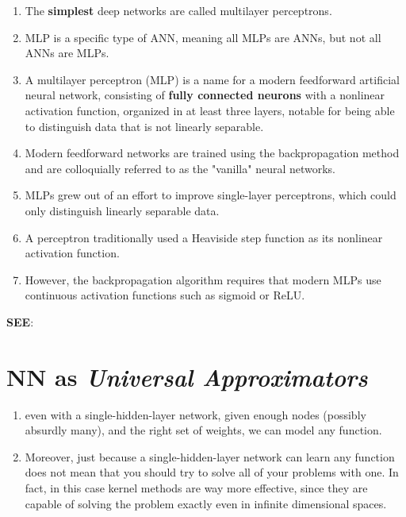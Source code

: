 \begin{enumerate}
    \item The \textbf{simplest} deep networks are called multilayer perceptrons.

    \item MLP is a specific type of ANN, meaning all MLPs are ANNs, but not all ANNs are MLPs.
    
    \item A multilayer perceptron (MLP) is a name for a modern feedforward artificial neural network, consisting of \textbf{fully connected neurons} with a nonlinear activation function, organized in at least three layers, notable for being able to distinguish data that is not linearly separable.

    \item Modern feedforward networks are trained using the backpropagation method and are colloquially referred to as the "vanilla" neural networks.

    \item MLPs grew out of an effort to improve single-layer perceptrons, which could only distinguish linearly separable data. 

    \item A perceptron traditionally used a Heaviside step function as its nonlinear activation function. 
    
    \item However, the backpropagation algorithm requires that modern MLPs use continuous activation functions such as sigmoid or ReLU.

    
\end{enumerate}


\noindent
\textbf{SEE}: 



\section{NN as \textit{Universal Approximators} \cite{dnn-1}} \label{nn as Universal Approximators}

\begin{enumerate}
    \item even with a single-hidden-layer network, given enough nodes (possibly absurdly many), and the right set of weights, we can model any function.

    \item Moreover, just because a single-hidden-layer network can learn any function does not mean that you should try to solve all of your problems with one. In fact, in this case kernel methods are way more effective, since they are capable of solving the problem exactly even in infinite dimensional spaces.

\end{enumerate}


